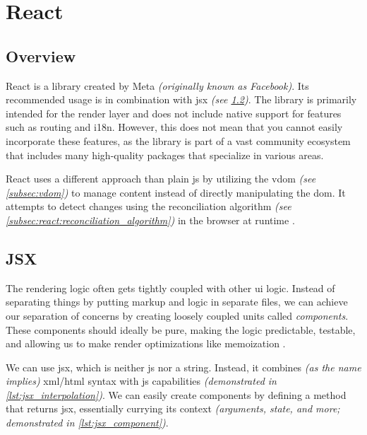 \section{React}
\label{sec:react}

\subsection{Overview}
\label{subsec:react:overview}

React is a \gls{library} \cite{lagadritu:limitations_react} created by Meta \textit{(originally known as Facebook)}. Its recommended usage is in combination with \acrshort{jsx} \cite{react:introduction_jsx} \textit{(see \ref{subsec:jsx})}. 
The library is primarily intended for the render layer and does not include native support for features such as routing and \acrshort{i18n}. However, this does not mean that you cannot easily incorporate these features, as the library is part of a vast community ecosystem that includes many high-quality packages that specialize in various areas.

React uses a different approach than plain \acrlong{js} by utilizing the \acrshort{vdom} \cite{react:vdom} \textit{(see \ref{subsec:vdom})} to manage content instead of directly manipulating the \acrshort{dom}. It attempts to detect changes using the reconciliation algorithm \textit{(see \ref{subsec:react:reconciliation_algorithm})} in the browser at runtime \cite{react:reconciliation}.

\subsection{JSX}
\label{subsec:jsx}

The rendering logic often gets tightly coupled with other \acrshort{ui} logic. Instead of separating things by putting markup and logic in separate files, we can achieve our separation of concerns \cite{enwiki:separation_of_concerns} by creating loosely coupled units called \textsl{components}. These components should ideally be pure, making the logic predictable, testable, and allowing us to make render optimizations like memoization \cite{enwiki:pure_function, react:keeping_components_pure}.

We can use \acrfull{jsx}, which is neither \acrshort{js} nor a string. Instead, it combines \textit{(as the name implies)} \acrshort{xml}/\acrshort{html} syntax with \acrshort{js} capabilities \textit{(demonstrated in \autoref{lst:jsx_interpolation})}. We can easily create components by defining a method that returns \acrshort{jsx}, essentially currying \cite{enwiki:currying} its context \textit{(arguments, state, and more; demonstrated in \autoref{lst:jsx_component})}.

